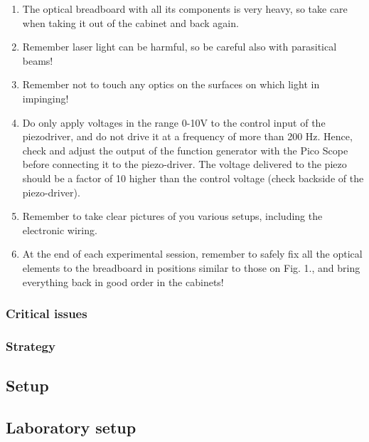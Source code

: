 \documentclass[a4paper, oneside, onecolumn, 11pt]{memoir}
\begin{document}
 \renewcommand{\labelenumi}{\Roman{enumi}}
\begin{enumerate}
    \item The optical breadboard with all its components is very heavy, so take care when taking it out of the cabinet and back again.
    \item Remember laser light can be harmful, so be careful also with parasitical beams!
    \item Remember not to touch any optics on the surfaces on which light in impinging!  
    \item Do only apply voltages in the range 0-10V to the control input of the piezodriver,
        and do not drive it at a frequency of more than 200 Hz. Hence, check and 
        adjust the output of the function generator with the Pico Scope before  
        connecting it to the piezo-driver. The voltage delivered to the piezo should be a   
        factor of 10 higher than the control voltage (check backside of the piezo-driver).
    \item Remember to take clear pictures of you various setups, including the 
        electronic wiring. 
    \item At the end of each experimental session, remember to safely fix all the optical 
        elements to the breadboard in positions similar to those on Fig. 1., and bring   
        everything back in good order in the cabinets!

\end{enumerate}

\subsubsection{Critical issues}

\subsubsection{Strategy}

\subsection{Setup}

\subsection{Laboratory setup}
\end{document}
